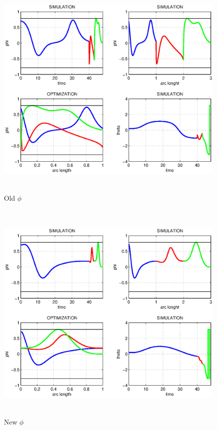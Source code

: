 \documentclass[12pt,a4paper]{article}
\theoremstyle{break}
\begin{document}
\begin{figure}[t]
  \begin{center}
    \includegraphics[height=11cm]{phi_old.eps}
    \caption{Old $\phi$}
    \label{fig:phi_old}
  \end{center}
\end{figure}

\begin{figure}[t]
  \begin{center}
    \includegraphics[height=11cm]{phi_new.eps}
    \caption{New $\phi$}
    \label{fig:phi_new}
  \end{center}
\end{figure}
\end{document}
